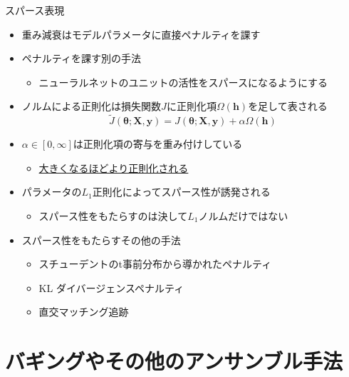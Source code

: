 \documentclass[dvipdfmx, 10pt]{beamer}
\begin{document}
\begin{frame}{スパース表現}
  \begin{itemize}
    \item 重み減衰はモデルパラメータに直接ペナルティを課す
    \item ペナルティを課す別の手法
    \begin{itemize}
      \item ニューラルネットのユニットの活性をスパースになるようにする
    \end{itemize}
    \item ノルムによる正則化は損失関数$J$に正則化項$\Omega(\bm{h})$を足して表される
    \begin{equation}
      \tilde{J}(\boldsymbol{\theta} ; \boldsymbol{X}, \boldsymbol{y})=J(\boldsymbol{\theta} ; \boldsymbol{X}, \boldsymbol{y})+\alpha \Omega(\boldsymbol{h})
    \end{equation}
    \item $\alpha \in [0, \infty]$は正則化項の寄与を重み付けしている
    \begin{itemize}
      \item \underline{大きくなるほどより正則化される}
    \end{itemize}
    \item パラメータの\alert{$L_{1}$正則化}によってスパース性が誘発される
    \begin{itemize}
      \item スパース性をもたらすのは決して$L_{1}$ノルムだけではない
    \end{itemize}
    \item スパース性をもたらすその他の手法
    \begin{itemize}
      \item スチューデントのt事前分布から導かれたペナルティ
      \item KL ダイバージェンスペナルティ
      \item 直交マッチング追跡
    \end{itemize}
  \end{itemize}
\end{frame}


\section{バギングやその他のアンサンブル手法}

\end{document}
